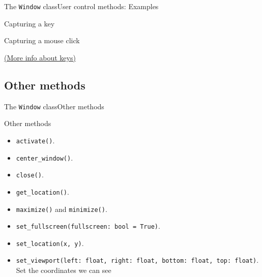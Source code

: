 \documentclass[10pt,compress]{beamer} %
\begin{document}
\begin{frame}[plain]{The \texttt{Window} class}{User control methods: Examples}
	\begin{exampleblock}{Capturing a key}
		\vspace{-0.2cm}
		
		\vspace{-0.2cm}
	\end{exampleblock}

	\begin{exampleblock}{Capturing a mouse click}
		\vspace{-0.2cm}
		
		\vspace{-0.2cm}
	\end{exampleblock}

	\href{https://api.arcade.academy/en/2.6.17/arcade.key.html}{(More info about keys)}
\end{frame}

\subsection{Other methods}

\begin{frame}{The \texttt{Window} class}{Other methods}
	\begin{block}{Other methods}
		\begin{itemize}
		\item \footnotesize{\texttt{activate()}}. 
		\item \footnotesize{\texttt{center\_window()}}. 
		\item \footnotesize{\texttt{close()}}. 
		\item \footnotesize{\texttt{get\_location()}}. 
		\item \footnotesize{\texttt{maximize()} and \texttt{minimize()}}. 
		\item \footnotesize{\texttt{set\_fullscreen(fullscreen: bool = True)}}. 
		\item \footnotesize{\texttt{set\_location(x, y)}}. 
		\item \footnotesize{\texttt{set\_viewport(left: float, right: float, bottom: float, top: float)}}. Set the coordinates we can see
		\end{itemize}
	\end{block}	
\end{frame}
\end{document}
